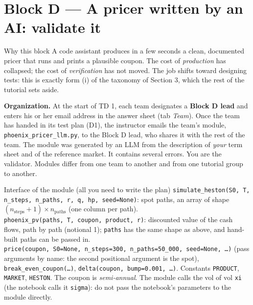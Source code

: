 \documentclass[11pt,a4paper]{article}
\begin{document}
\section{Block D --- A pricer written by an AI: validate it}

\begin{greybox}{Why this block}
A code assistant produces in a few seconds a clean, documented pricer that runs and prints a
plausible coupon. The cost of \emph{production} has collapsed; the cost of \emph{verification} has not moved.
The job shifts toward designing tests: this is exactly form (i) of the taxonomy of Section 3, which
the rest of the tutorial sets aside.
\end{greybox}

\noindent\textbf{Organization.} At the start of TD 1, each team designates a \textbf{Block D lead} and enters his or her
email address in the answer sheet (tab \emph{Team}). Once the team has handed in its test plan (D1), the
instructor emails the team's module, \texttt{phoenix\_pricer\_llm.py}, to the Block D lead, who shares it
with the rest of the team. The module was generated by an LLM from the description of \emph{your} term
sheet and of the reference market. It contains several errors. You are the validator. Modules differ
from one team to another and from one tutorial group to another.

\begin{greybox}{Interface of the module (all you need to write the plan)}
\small
\texttt{simulate\_heston(S0, T, n\_steps, n\_paths, r, q, hp, seed=None)}: spot paths, an array of shape
$(n_{\text{steps}}+1) \times n_{\text{paths}}$ (one column per path).\\
\texttt{phoenix\_pv(paths, T, coupon, product, r)}: discounted value of the cash flows, path by path (notional
1); \texttt{paths} has the same shape as above, and hand-built paths can be passed in.\\
\texttt{price(coupon, S0=None, n\_steps=300, n\_paths=50\_000, seed=None, \ldots)} (pass arguments by name:
the second positional argument is the spot), \texttt{break\_even\_coupon(\ldots)}, \texttt{delta(coupon, bump=0.001, \ldots)}.
Constants \texttt{PRODUCT}, \texttt{MARKET}, \texttt{HESTON}. The coupon is \emph{semi-annual}. The module calls the vol of vol \texttt{xi} (the
notebook calls it \texttt{sigma}): do not pass the notebook's parameters to the module directly.
\end{greybox}
\end{document}
